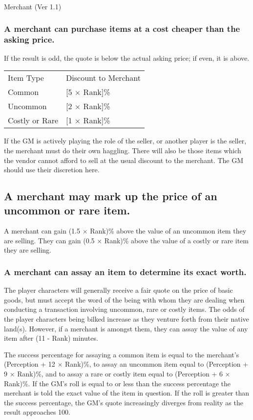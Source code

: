 \begin{Chapter}{Merchant (Ver 1.1)}
\subsubsection{A merchant can purchase items at a cost cheaper than the asking price.}

If the result is odd, the quote is below the actual asking price; if
even, it is above.

\begin{tabular}{ll}
Item Type	& Discount to Merchant  \\
Common		& [5 × Rank]\% \\
Uncommon	& [2 × Rank]\% \\ 
Costly or Rare	& [1 × Rank]\% \\
\end{tabular}

If the GM is actively playing the role of the seller, or another
player is the seller, the merchant must do their own haggling.  There
will also be those items which the vendor cannot afford to sell at the
usual discount to the merchant.  The GM should use their discretion
here.

\subsection{A  merchant  may  mark  up  the  price  of  an  uncommon or rare item.}

A merchant can gain (1.5 × Rank)\% above the value of an uncommon item
they are selling.  They can gain (0.5 × Rank)\% above the value of a
costly or rare item they are selling.

\subsubsection{A merchant can assay an item to determine its exact worth.}

The player characters will generally receive a fair quote on the price
of basic goods, but must accept the word of the being with whom they
are dealing when conducting a transaction involving uncommon, rare or
costly items.  The odds of the player characters being bilked increase
as they venture forth from their native land(s). However, if a
merchant is amongst them, they can assay the value of any item after
(11 - Rank) minutes.

The success percentage for assaying a common item is equal to the
merchant’s (Perception + 12 × Rank)\%, to assay an uncommon item equal
to (Perception + 9 × Rank)\%, and to assay a rare or costly item equal
to (Perception + 6 × Rank)\%.  If the GM’s roll is equal to or less
than the success percentage the merchant is told the exact value of
the item in question.  If the roll is greater than the success
percentage, the GM’s quote increasingly diverges from reality as the
result approaches 100.


\end{Chapter}

